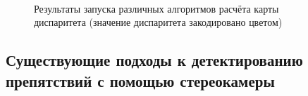 \documentclass[aps,%
14pt,%
final,%
oneside,
onecolumn,%
musixtex, %
superscriptaddress,%
centertags]{extarticle} %
\begin{document}
\begin{figure}[htp]
\centering
{}\\
\\
\\
\caption{Результаты запуска различных алгоритмов расчёта карты диспаритета (значение диспаритета закодировано цветом)}
\label{fig:compare_stereo}
\end{figure}


\subsection{Существующие подходы к детектированию препятствий с помощью стереокамеры}
\end{document}
